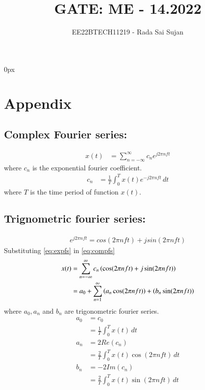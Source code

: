 \documentclass[journal,12pt,twocolumn]{IEEEtran}
\theoremstyle{remark}
\begin{document}
\parindent 0px

\title{GATE: ME - 14.2022}
\author{EE22BTECH11219 - Rada Sai Sujan$^{}$%
}
\maketitle
\newpage
\bigskip
\section*{Appendix}
\subsection*{Complex Fourier series:}
\begin{align}
	x(t) &= \sum_{n=-\infty}^{\infty} c_{n}e^{j2\pi nft}
	\label{eq:compfs}
\end{align}
where $c_{n}$ is the exponential fourier coefficient.
\begin{align}
        c_{n} &= \frac{1}{T} \int_{0}^{T} x(t) e^{-j2\pi nft} \, dt
\end{align}
where $T$ is the time period of function $x(t)$.    \\
\subsection*{Trignometric fourier series:}
\begin{align}
	e^{j2\pi nft} = cos(2\pi nf t) + j sin(2\pi nft)
	\label{eq:expfs}
\end{align}
Substituting \eqref{eq:expfs} in \eqref{eq:compfs}
\begin{align}
	 x(t) &= \sum_{n=-\infty}^{\infty} c_{n} \left(\cos(2\pi nft) + j \sin(2\pi nft)\right)\\
	      &= a_0 + \sum_{n=1}^{\infty} \left(a_{n} \cos(2\pi nft)\right) + \left(b_{n} \sin(2\pi nft)\right)
\end{align}
where $a_0, a_{n}$ and $b_{n}$ are trigonometric fourier series.
\begin{align}
          a_{0} &= c_{0}\\
                &=\frac{1}{T} \int_{0}^{T} x(t) \, dt\\
          a_{n} &= 2Re(c_{n})\\
                &=\frac{2}{T} \int_{0}^{T} x(t)\cos(2\pi nft) \, dt\\
          b_{n} &= -2Im(c_{n})\\
                &= \frac{2}{T} \int_{0}^{T} x(t)\sin(2\pi nft) \, dt
\end{align}
\end{document}
